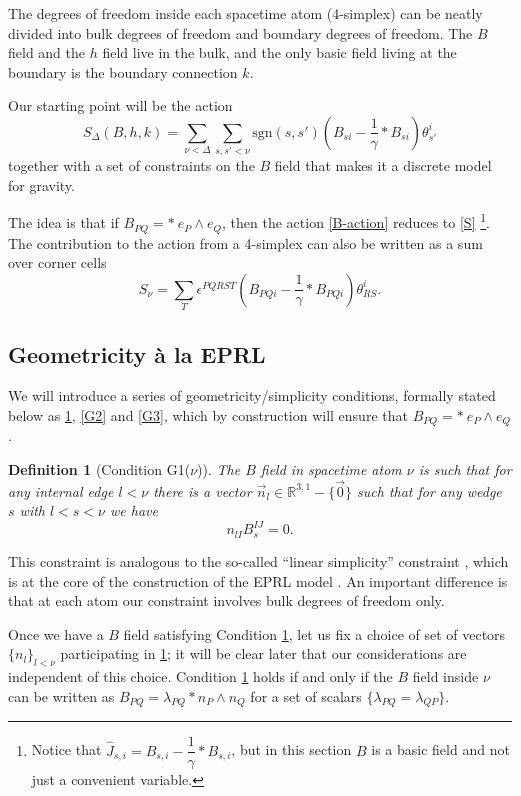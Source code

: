 \documentclass{article}
\newcommand{\R}{{\mathbb R}}
\newtheorem{definition}{Definition}
\begin{document}
The degrees of freedom inside each spacetime atom (4-simplex) can be neatly divided into bulk degrees of freedom and boundary degrees of freedom. The $B$ field and the $h$ field live in the bulk, and the only basic field living at the boundary is the boundary connection $k$. 

Our starting point will be the action 
\begin{equation}\label{B-action}
	S_{\Delta}(B, h, k)=\sum_{\nu<\Delta}\sum_{s,s'<\nu}\text{sgn}(s,s')\left( B_{s i}-\dfrac{1}{\gamma}{\ast}B_{s i} \right) \theta^{i}_{s'}  
\end{equation}	
together with a set of constraints on the $B$ field that makes it a discrete model for gravity. 

The idea is that if $B_{PQ} = \ast \ e_P \wedge e_Q$, then the action \eqref{B-action} reduces to \eqref{S}%
\footnote{Notice that $\hat{J}_{s,i}=B_{s,i}-\dfrac{1}{\gamma}{\ast}B_{s,i}$, but in this section $B$ is a basic field and not just a convenient variable.}. 
The contribution to the action from a 4-simplex can also be written as a sum over corner cells 
\[
S_\nu = \sum_T \epsilon^{PQRST}
\left( B_{PQ i}-\dfrac{1}{\gamma}{\ast}B_{PQ i} \right) \theta^{i}_{RS} . 
\]


\subsection{Geometricity à la EPRL}\label{GeometricityEPRL}


We will introduce a series of geometricity/simplicity conditions, formally stated below as \ref{G1}, \ref{G2} and \ref{G3}, 
which by construction will ensure that $B_{PQ} = \ast \ e_P \wedge e_Q$. 

\begin{definition}[Condition G1($\nu$)]\label{G1}
The $B$ field in spacetime atom $\nu$ is such that 
for any internal edge $l < \nu$ there is a vector $\vec{n}_l \in \R^{3,1} - \{ \vec{0} \}$ such that for any wedge $s$ with $l<s<\nu$ we have 
\[
n_{l I} B_s^{IJ}=0 .
\]	
\end{definition}

\noindent 
This constraint is analogous to the so-called ``linear simplicity'' constraint \cite{FK}, which is at the core of the construction of the EPRL model \cite{EPRL}. 
An important difference is that at each atom our constraint involves bulk degrees of freedom only. 


Once we have a $B$ field satisfying Condition \ref{G1}, let us fix a choice of set of vectors $\{ n_l \}_{l<\nu}$ participating in \ref{G1}; 
it will be clear later that our considerations are independent of this choice. Condition \ref{G1} holds if and only if the $B$ field inside $\nu$ can be written as $B_{PQ} = \lambda_{PQ} \ast n_P \wedge n_Q$ for a set of scalars $\{\lambda_{PQ}=\lambda_{QP}\}$. 
\end{document}
